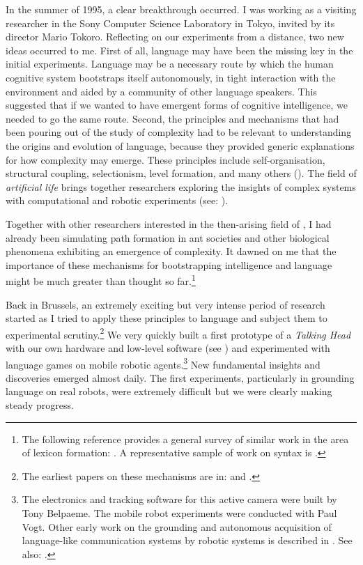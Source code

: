 In the summer of 1995, a clear breakthrough occurred.  
I was working as a visiting researcher in the Sony
Computer Science Laboratory in Tokyo, invited by its director
Mario Tokoro. Reflecting on our 
experiments from a distance, two new ideas occurred to me. 
First of all, language may have been the missing key
in the initial experiments. Language may 
be a necessary route by which the human cognitive system
bootstraps itself autonomously, in tight interaction with the
environment and aided by a community of other
language speakers. This suggested that if we wanted
to have emergent
forms of cognitive intelligence, we needed to go the same 
route. Second, the principles and mechanisms that had been
pouring out of the study of complexity had to be
relevant to understanding the origins and evolution of language,
because they provided generic explanations for how complexity 
may emerge. These principles include 
self-organisation, structural coupling, 
selectionism, level formation, 
and many others (\citealt{Nicolis:1989}). The field of {\itshape artificial life} brings together researchers
exploring the insights of complex systems with computational
and robotic experiments (see: \citealt{Langton:1995}).

Together with 
other researchers interested in the then-arising field of , I had 
already been simulating path formation in 
ant societies and other biological phenomena exhibiting 
an emergence of complexity. It dawned on me that the
importance of these mechanisms for bootstrapping intelligence and
language might be much greater than 
thought so far.\footnote{The following reference provides a general survey of similar work in 
the area of lexicon formation: \cite{Steels:97b}. 
A representative sample of work on syntax is \cite{Briscoe:1999}.}

\clearpage
Back in Brussels, an extremely exciting but very 
intense period of research started as I tried to 
apply these principles to language
and subject them to experimental 
scrutiny.\footnote{The earliest papers on these mechanisms are in: \cite{Steels:95b} and 
\cite{Steels:96a}.}
We very quickly built a first 
prototype of a {\itshape Talking Head} with our own hardware
and low-level software (see ) 
and experimented with language games on mobile 
robotic agents.\footnote{The electronics and tracking software for this 
active camera were built by Tony Belpaeme. The mobile
robot experiments were conducted with Paul Vogt. 
Other early work on the grounding and autonomous acquisition of 
language-like communication systems by robotic systems is 
described in \cite{Steels:97g}. See also: \cite{Billard:1998}.}
New fundamental insights and discoveries emerged almost daily. 
The first experiments, particularly in grounding
language on real robots, were extremely difficult but we 
were clearly making steady progress. 


